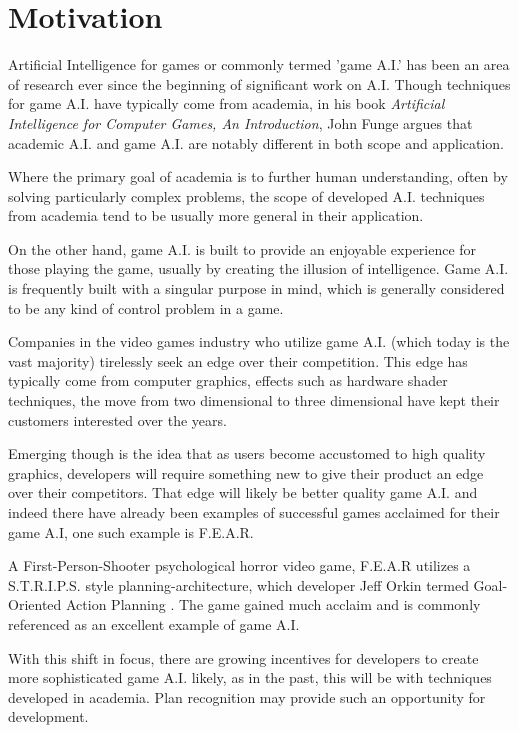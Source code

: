\documentclass[parskip]{cs4rep}
\begin{document}
\section{Motivation}

Artificial Intelligence for games or commonly termed 'game A.I.' has been an area of research ever since the beginning of significant work on A.I. Though techniques for game A.I. have typically come from academia, in his book \textit{Artificial Intelligence for Computer Games, An Introduction}, John Funge argues \cite{JohnFunge:AIForComp} that academic A.I. and game A.I. are notably different in both scope and application.

Where the primary goal of academia is to further human understanding, often by solving particularly complex problems, the scope of developed A.I. techniques from academia tend to be usually more general in their application.

On the other hand, game A.I. is built to provide an enjoyable experience for those playing the game, usually by creating the illusion of intelligence. Game A.I. is frequently built with a singular purpose in mind, which is generally considered to be any kind of control problem in a game.

Companies in the video games industry who utilize game A.I. (which today is the vast majority) tirelessly seek an edge over their competition. This edge has typically come from computer graphics, effects such as hardware shader techniques, the move from two dimensional to three dimensional have kept their customers interested over the years. 

Emerging though is the idea that as users become accustomed to high quality graphics, developers will require something new to give their product an edge over their competitors. That edge will likely be better quality game A.I. and indeed there have already been examples of successful games acclaimed for their game A.I, one such example is F.E.A.R. 

A First-Person-Shooter psychological horror video game, F.E.A.R utilizes a S.T.R.I.P.S. style planning-architecture, which developer Jeff Orkin termed Goal-Oriented Action Planning \cite{citeulike:5386647}. The game gained much acclaim and is commonly referenced as an excellent example of game A.I.

With this shift in focus, there are growing incentives for developers to create more sophisticated game A.I. likely, as in the past, this will be with techniques developed in academia. Plan recognition may provide such an opportunity for development. 
\end{document}
